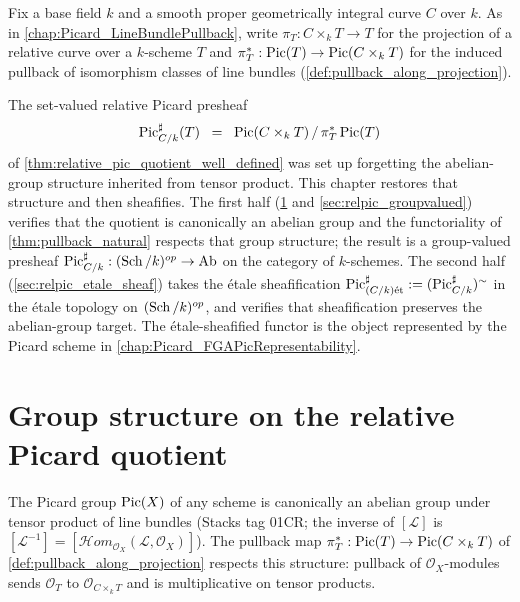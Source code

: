Fix a base field \(k\) and a smooth proper geometrically integral curve \(C\) over
\(k\). As in \cref{chap:Picard_LineBundlePullback}, write
\(\pi_T : C \times_k T \to T\) for the projection of a relative curve over a
\(k\)-scheme \(T\) and
\(\pi_T^* : \operatorname{Pic}(T) \to \operatorname{Pic}(C \times_k T)\) for the induced pullback of
isomorphism classes of line bundles (\cref{def:pullback_along_projection}).

The set-valued relative Picard presheaf
\[
  \operatorname{Pic}^\sharp_{C/k}(T) \;\;=\;\; \operatorname{Pic}(C \times_k T) \, / \, \pi_T^*\operatorname{Pic}(T)
\]
of \cref{thm:relative_pic_quotient_well_defined} was set up forgetting the
abelian-group structure inherited from tensor product. This chapter restores
that structure and then sheafifies. The first half (\cref{sec:relpic_group}
and \cref{sec:relpic_groupvalued}) verifies that the quotient is canonically
an abelian group and the functoriality of \cref{thm:pullback_natural} respects
that group structure; the result is a group-valued presheaf
\(\operatorname{Pic}^\sharp_{C/k} : (\operatorname{Sch}/k)^{op} \to \mathrm{Ab}\) on the category of \(k\)-schemes. The
second half (\cref{sec:relpic_etale_sheaf}) takes the \'etale sheafification
\(\operatorname{Pic}^\sharp_{(C/k)\mathrm{\acute{e}t}} := (\operatorname{Pic}^\sharp_{C/k})^\sim\) in the \'etale topology on
\((\operatorname{Sch}/k)^{op}\), and verifies that sheafification preserves the abelian-group
target. The \'etale-sheafified functor is the object represented by the Picard
scheme in \cref{chap:Picard_FGAPicRepresentability}.

\section{Group structure on the relative Picard quotient}
\label{sec:relpic_group}

The Picard group \(\operatorname{Pic}(X)\) of any scheme is canonically an abelian group under
tensor product of line bundles (Stacks tag 01CR; the inverse of \([\mathcal{L}]\)
is $[\mathcal{L}^{-1}] = [\mathcal{H}om_{\mathcal{O}_X}(\mathcal{L},
\mathcal{O}_X)]$). The pullback map
\(\pi_T^* : \operatorname{Pic}(T) \to \operatorname{Pic}(C \times_k T)\) of
\cref{def:pullback_along_projection} respects this structure: pullback of
\(\mathcal{O}_X\)-modules sends \(\mathcal{O}_T\) to \(\mathcal{O}_{C \times_k T}\)
and is multiplicative on tensor products.


